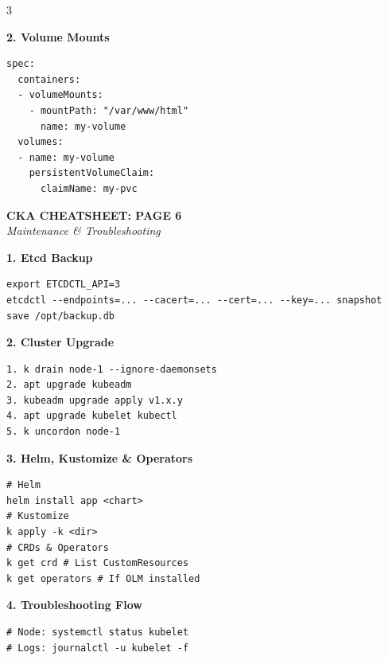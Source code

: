 \documentclass[10pt,landscape]{article}
\newcommand{\sectionheader}[1]{%
    \vspace{2pt}\noindent\colorbox{blue!15}{\parbox{\dimexpr\linewidth-2\fboxsep}{%
    \textbf{#1}}}\vspace{2pt}%
}
\begin{document}
\begin{multicols*}{3}
\sectionheader{2. Volume Mounts}
\begin{lstlisting}
spec:
  containers:
  - volumeMounts:
    - mountPath: "/var/www/html"
      name: my-volume
  volumes:
  - name: my-volume
    persistentVolumeClaim:
      claimName: my-pvc
\end{lstlisting}

\columnbreak

\begin{center}\textbf{\Large CKA CHEATSHEET: PAGE 6}\\\textit{Maintenance \& Troubleshooting}\end{center}

\sectionheader{1. Etcd Backup}
\begin{lstlisting}
export ETCDCTL_API=3
etcdctl --endpoints=... --cacert=... --cert=... --key=... snapshot save /opt/backup.db
\end{lstlisting}

\sectionheader{2. Cluster Upgrade}
\begin{lstlisting}
1. k drain node-1 --ignore-daemonsets
2. apt upgrade kubeadm
3. kubeadm upgrade apply v1.x.y
4. apt upgrade kubelet kubectl
5. k uncordon node-1
\end{lstlisting}

\sectionheader{3. Helm, Kustomize \& Operators}
\begin{lstlisting}
# Helm
helm install app <chart>
# Kustomize
k apply -k <dir>
# CRDs & Operators
k get crd # List CustomResources
k get operators # If OLM installed
\end{lstlisting}

\sectionheader{4. Troubleshooting Flow}
\begin{center}
\end{center}
\begin{lstlisting}
# Node: systemctl status kubelet
# Logs: journalctl -u kubelet -f
\end{lstlisting}

\end{multicols*}
\end{document}
